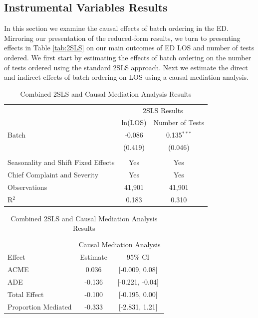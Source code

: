 \documentclass[,,nonblindrev]{informs}
\begin{document}
\hypertarget{instrumental-variables-results}{%
\subsection{Instrumental Variables
Results}\label{instrumental-variables-results}}

In this section we examine the causal effects of batch ordering in the
ED. Mirroring our presentation of the reduced-form results, we turn to
presenting effects in Table \ref{tab:2SLS} on our main outcomes of ED
LOS and number of tests ordered. We first start by estimating the
effects of batch ordering on the number of tests ordered using the
standard 2SLS approach. Next we estimate the direct and indirect effects
of batch ordering on LOS using a causal mediation analysis.

\begin{table}[!htbp]
\centering
\begin{threeparttable}
\caption{Combined 2SLS and Causal Mediation Analysis Results}
\label{tab:combined_results}
\begin{tabular*}{\textwidth}{@{\extracolsep{\fill}} lcc}
\toprule
& \multicolumn{2}{c}{2SLS Results} \\
\cmidrule{2-3}
& ln(LOS) & Number of Tests \\
\midrule
Batch & -0.086 & 0.135$^{***}$ \\
& (0.419) & (0.046) \\
& & \\
\addlinespace
Seasonality and Shift Fixed Effects & Yes & Yes \\
Chief Complaint and Severity & Yes & Yes \\
\midrule
Observations & 41,901 & 41,901 \\
R$^{2}$ & 0.183 & 0.310 \\
\bottomrule
\end{tabular*}

\smallskip %

\begin{tabular*}{\textwidth}{@{\extracolsep{\fill}} lcc}
\toprule
& \multicolumn{2}{c}{Causal Mediation Analysis} \\
\cmidrule{2-3}
Effect & Estimate & 95\% CI \\
\midrule
ACME & 0.036 & [-0.009, 0.08] \\
ADE & -0.136 & [-0.221, -0.04] \\
Total Effect & -0.100 & [-0.195, 0.00] \\
Proportion Mediated & -0.333 & [-2.831, 1.21] \\
\bottomrule
\end{tabular*}


\end{threeparttable}
\end{table}
\end{document}

